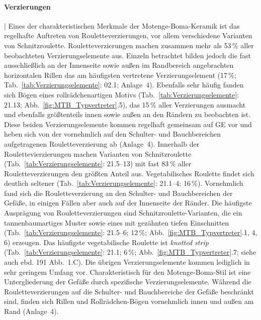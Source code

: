 \paragraph{Verzierungen}\hspace{-.5em}|\hspace{.5em}%
Eines der charakteristischen Merkmale der Motenge-Boma-Keramik ist das regelhafte Auftreten von Rouletteverzierungen, vor allem verschiedene Varianten von Schnitzroulette. Rouletteverzierungen machen zusammen mehr als 53\,\% aller beobachteten Verzierungselemente aus. Einzeln betrachtet bilden jedoch die fast ausschließlich an der Innenseite sowie außen im Randbereich angebrachten horizontalen Rillen das am häufigsten vertretene Verzierungselement (17\,\%; Tab.~\ref{tab:Verzierungselemente}: 02.1; Anlage~4). Ebenfalls sehr häufig fanden sich Bögen eines rollrädchenartigen Motivs (Tab.~\ref{tab:Verzierungselemente}: 21.13; Abb.~\ref{fig:MTB_Typvertreter}.5), das 15\,\% aller Verzierungen ausmacht und ebenfalls größtenteils innen sowie außen an den Rändern zu beobachten ist. Diese beiden Verzierungselemente kommen regelhaft gemeinsam auf GE vor und heben sich von der vornehmlich auf den Schulter- und Bauchbereichen aufgetragenen Rouletteverzierung ab (Anlage~4). Innerhalb der Roulettevierzierungen machen Varianten von Schnitzroulette (Tab.~\ref{tab:Verzierungselemente}: 21.5--13) mit fast 83\,\% aller Rouletteverzierungen den größten Anteil aus. Vegetabilisches \mbox{Roulette} findet sich deutlich seltener (Tab.~\ref{tab:Verzierungselemente}: 21.1--4; 16\,\%). Vornehmlich fand sich die Rouletteverzierung an den Schulter- und Bauchbereichen der Gefäße, in einigen Fällen aber auch auf der Innenseite der Ränder. Die häufigste Ausprägung von Rouletteverzierungen sind Schnitzroulette-Varianten, die ein tannenbaumartiges Muster \parencite[Tab.~\ref{tab:Verzierungselemente}: 21.12; 12\,\%; \textsc{Van Noten} 1982: Abb. 40.3; Abb.~\ref{fig:MTB_Typvertreter}.2, 4; siehe auch][Abb.~1.E]{LivingstoneSmith.2007} sowie eines mit gezähnten tiefen Einschnitten (Tab.~\ref{tab:Verzierungselemente}: 21.5--6; 12\,\%; Abb.~\ref{fig:MTB_Typvertreter}.1, 4, 6) erzeugen. Das häufigste vegetabilische \mbox{Roulette} ist \textit{knotted strip} (Tab.~\ref{tab:Verzierungselemente}: 21.1; 6\,\%; Abb.~\ref{fig:MTB_Typvertreter}.7; siehe auch ebd. 191 Abb.~1.C). Die übrigen Verzierungselemente kommen lediglich in sehr geringem Umfang vor. Charakteristisch für den Motenge-Boma-Stil ist eine Untergliederung der Gefäße durch spezifische Verzierungselemente. Während die Rouletteverzierungen auf die Schulter- und Bauchbereiche der Gefäße beschränkt sind, finden sich Rillen und Rollrädchen-Bögen vornehmlich innen und außen am Rand (Anlage~4).


